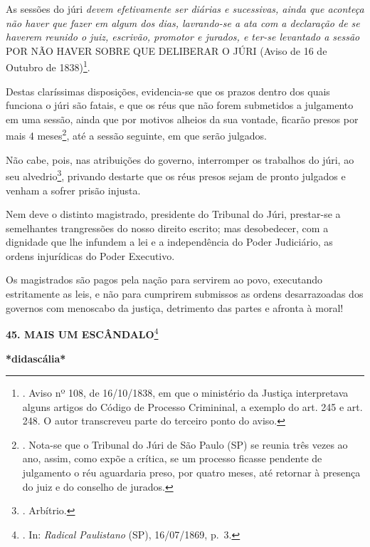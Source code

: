 As sessões do júri \emph{devem efetivamente ser diárias e sucessivas,
ainda que aconteça não haver que fazer em algum dos dias, lavrando-se a
ata com a declaração de se haverem reunido o juiz, escrivão, promotor e
jurados, e ter-se levantado a sessão} POR NÃO HAVER SOBRE QUE DELIBERAR
O JÚRI (Aviso de 16 de Outubro de 1838)\footnote{. Aviso nº 108, de
  16/10/1838, em que o ministério da Justiça interpretava alguns artigos
  do Código de Processo Crimininal, a exemplo do art. 245 e art. 248. O
  autor transcreveu parte do terceiro ponto do aviso.}.

Destas claríssimas disposições, evidencia-se que os prazos dentro dos
quais funciona o júri são fatais, e que os réus que não forem submetidos
a julgamento em uma sessão, ainda que por motivos alheios da sua
vontade, ficarão presos por mais 4 meses\footnote{. Nota-se que o
  Tribunal do Júri de São Paulo (SP) se reunia três vezes ao ano, assim,
  como expõe a crítica, se um processo ficasse pendente de julgamento o
  réu aguardaria preso, por quatro meses, até retornar à presença do
  juiz e do conselho de jurados.}, até a sessão seguinte, em que serão
julgados.

Não cabe, pois, nas atribuições do governo, interromper os trabalhos do
júri, ao seu alvedrio\footnote{. Arbítrio.}, privando destarte que os
réus presos sejam de pronto julgados e venham a sofrer prisão injusta.

Nem deve o distinto magistrado, presidente do Tribunal do Júri,
prestar-se a semelhantes trangressões do nosso direito escrito; mas
desobedecer, com a dignidade que lhe infundem a lei e a independência do
Poder Judiciário, as ordens injurídicas do Poder Executivo.

Os magistrados são pagos pela nação para servirem ao povo, executando
estritamente as leis, e não para cumprirem submissos as ordens
desarrazoadas dos governos com menoscabo da justiça, detrimento das
partes e afronta à moral!

\textbf{45. MAIS UM ESCÂNDALO}\footnote{. In: \emph{Radical Paulistano}
  (SP), 16/07/1869, p.~3.}

\textbf{*didascália*}

